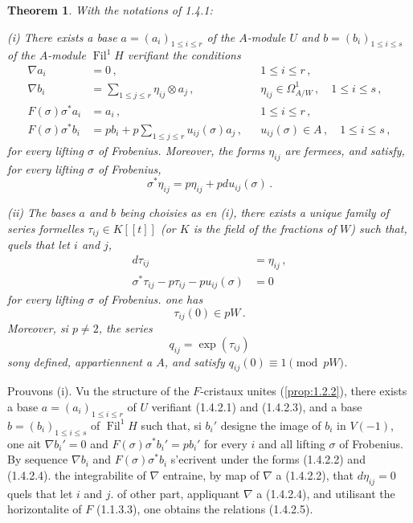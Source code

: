 \documentclass[12pt,a4paper]{article}
\theoremstyle{plain}
\newtheorem{theorem}{Theorem}[section]
\theoremstyle{definition}
\theoremstyle{remark}
\DeclareMathOperator{\Fil}{Fil}
\begin{document}
\begin{theorem}\label{thm:1.4.2}
With the notations of \emph{1.4.1}:

\emph{(i)} There exists a base $a = (a_i)_{1 \leq i \leq r}$ of the $A$-module $U$ and $b = (b_i)_{1 \leq i \leq s}$ of the $A$-module $\Fil^1H$ verifiant the conditions
\begin{align}
\nabla a_i &= 0\,, && 1 \leq i \leq r\,, \label{eq:1.4.2.1} \\
\nabla b_i &= \sum_{1 \leq j \leq r} \eta_{ij} \otimes a_j\,, && \eta_{ij} \in \Omega^1_{A/W}\,, \quad 1 \leq i \leq s\,, \label{eq:1.4.2.2} \\
F(\sigma)\sigma^*a_i &= a_i\,, && 1 \leq i \leq r\,, \label{eq:1.4.2.3} \\
F(\sigma)\sigma^*b_i &= pb_i + p\sum_{1 \leq j \leq r} u_{ij}(\sigma)a_j\,, && u_{ij}(\sigma) \in A\,, \quad 1 \leq i \leq s\,, \label{eq:1.4.2.4}
\end{align}
for every lifting $\sigma$ of Frobenius. Moreover, the forms $\eta_{ij}$ are fermees, and satisfy, for every lifting $\sigma$ of Frobenius,
\begin{equation}\label{eq:1.4.2.5}
\sigma^*\eta_{ij} = p\eta_{ij} + pdu_{ij}(\sigma)\,.\end{equation}

\emph{(ii)} The bases $a$ and $b$ being choisies as en (i), there exists a unique family of series formelles $\tau_{ij} \in K[[t]]$ (or $K$ is the field of the fractions of $W$) such that, quels that let $i$ and $j$,
\begin{align}
d\tau_{ij} &= \eta_{ij}\,, \label{eq:1.4.2.6} \\
\sigma^*\tau_{ij} - p\tau_{ij} - pu_{ij}(\sigma) &= 0 \label{eq:1.4.2.7}
\end{align}
for every lifting $\sigma$ of Frobenius. one has
\begin{equation}\label{eq:1.4.2.8}
\tau_{ij}(0) \in pW\,.\end{equation}
Moreover, si $p \neq 2$, the series
\begin{equation}\label{eq:1.4.2.9}
q_{ij} = \exp(\tau_{ij})\end{equation}
sony defined, appartiennent a $A$, and satisfy $q_{ij}(0) \equiv 1 \pmod{pW}$.
\end{theorem}

Prouvons (i). Vu the structure of the $F$-cristaux unites (\ref{prop:1.2.2}), there exists a base $a = (a_i)_{1 \leq i \leq r}$ of $U$ verifiant (1.4.2.1) and (1.4.2.3), and a base $b = (b_i)_{1 \leq i \leq s}$ of $\Fil^1H$ such that, si $b_i'$ designe the image of $b_i$ in $V(-1)$, one ait $\nabla b_i' = 0$ and $F(\sigma)\sigma^*b_i' = pb_i'$ for every $i$ and all lifting $\sigma$ of Frobenius. By sequence $\nabla b_i$ and $F(\sigma)\sigma^*b_i$ s'ecrivent under the forms (1.4.2.2) and (1.4.2.4). the integrabilite of $\nabla$ entraine, by map of $\nabla$ a (1.4.2.2), that $d\eta_{ij} = 0$ quels that let $i$ and $j$. of other part, appliquant $\nabla$ a (1.4.2.4), and utilisant the horizontalite of $F$ (1.1.3.3), one obtains the relations (1.4.2.5).
\end{document}
